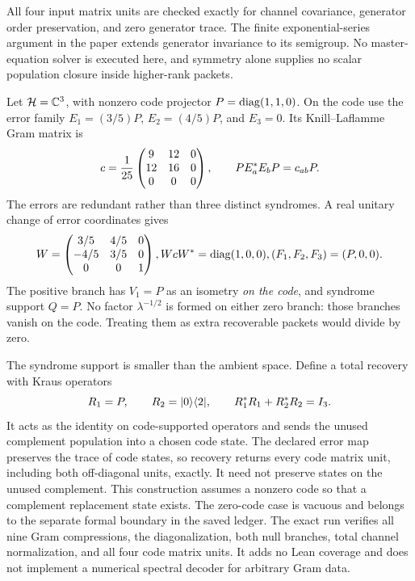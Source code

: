 All four input matrix units are checked exactly for channel covariance, generator order preservation, and zero generator trace. The finite exponential-series argument in the paper extends generator invariance to its semigroup. No master-equation solver is executed here, and symmetry alone supplies no scalar population closure inside higher-rank packets.

Let $\HH=\CC^3$, with nonzero code projector $P=\operatorname{diag}(1,1,0)$. On the code use the error family $E_1=(3/5)P$, $E_2=(4/5)P$, and $E_3=0$. Its Knill--Laflamme Gram matrix is
\[
c=\frac1{25}\begin{pmatrix}9&12&0\\12&16&0\\0&0&0\end{pmatrix},
\qquad PE_a^*E_bP=c_{ab}P.
\]
The errors are redundant rather than three distinct syndromes. A real unitary change of error coordinates gives
\[
W=\begin{pmatrix}3/5&4/5&0\\-4/5&3/5&0\\0&0&1\end{pmatrix},
 WcW^*=\operatorname{diag}(1,0,0),
(F_1,F_2,F_3)=(P,0,0).
\]
The positive branch has $V_1=P$ as an isometry \emph{on the code}, and syndrome support $Q=P$. No factor $\lambda^{-1/2}$ is formed on either zero branch: those branches vanish on the code. Treating them as extra recoverable packets would divide by zero.

The syndrome support is smaller than the ambient space. Define a total recovery with Kraus operators
\[
R_1=P,\qquad R_2=\lvert 0\rangle\langle 2\rvert,
\qquad R_1^*R_1+R_2^*R_2=I_3.
\]
It acts as the identity on code-supported operators and sends the unused complement population into a chosen code state. The declared error map preserves the trace of code states, so recovery returns every code matrix unit, including both off-diagonal units, exactly. It need not preserve states on the unused complement.
This construction assumes a nonzero code so that a complement replacement state exists. The zero-code case is vacuous and belongs to the separate formal boundary in the saved ledger. The exact run verifies all nine Gram compressions, the diagonalization, both null branches, total channel normalization, and all four code matrix units. It adds no Lean coverage and does not implement a numerical spectral decoder for arbitrary Gram data.

